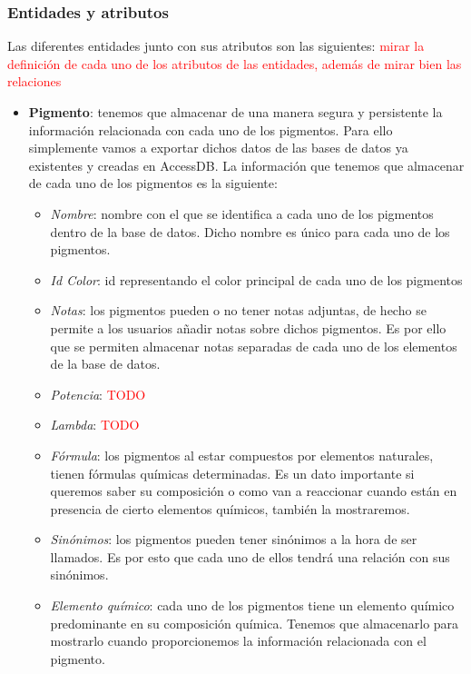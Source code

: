\subsubsection{Entidades y atributos}

Las diferentes entidades junto con sus atributos son las siguientes: \textcolor{red}{mirar la definición de cada uno de los atributos de las entidades, además de mirar bien las relaciones}
\begin{itemize}
    \item \textbf{Pigmento}: tenemos que almacenar de una manera segura y persistente la información relacionada con cada uno de los pigmentos. Para ello simplemente vamos a exportar dichos datos de las bases de datos ya existentes y creadas en AccessDB. La información que tenemos que almacenar de cada uno de los pigmentos es la siguiente:
        \begin{itemize}
            \item \textit{Nombre}: nombre con el que se identifica a cada uno de los pigmentos dentro de la base de datos. Dicho nombre es único para cada uno de los pigmentos.
            \item \textit{Id Color}: id representando el color principal de cada uno de los pigmentos
            \item \textit{Notas}: los pigmentos pueden o no tener notas adjuntas, de hecho se permite a los usuarios añadir notas sobre dichos pigmentos. Es por ello que se permiten almacenar notas separadas de cada uno de los elementos de la base de datos.
            \item \textit{Potencia}: \textcolor{red}{TODO}
            \item \textit{Lambda}: \textcolor{red}{TODO}
            \item \textit{Fórmula}: los pigmentos al estar compuestos por elementos naturales, tienen fórmulas químicas determinadas. Es un dato importante si queremos saber su composición o como van a reaccionar cuando están en presencia de cierto elementos químicos, también la mostraremos.
            \item \textit{Sinónimos}: los pigmentos pueden tener sinónimos a la hora de ser llamados. Es por esto que cada uno de ellos tendrá una relación con sus sinónimos. 
            \item \textit{Elemento químico}: cada uno de los pigmentos tiene un elemento químico predominante en su composición química. Tenemos que almacenarlo para mostrarlo cuando proporcionemos la información relacionada con el pigmento.
        \end{itemize}
        

\end{itemize}
